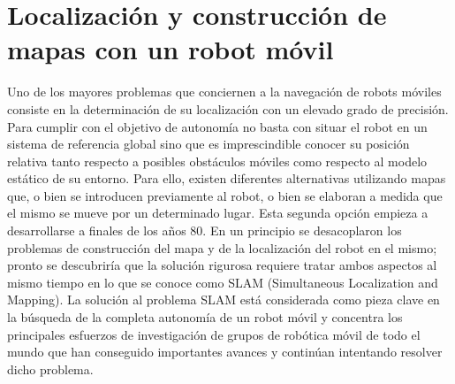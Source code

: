 \section{Localización y construcción de mapas con un robot móvil}
Uno de los mayores problemas que conciernen a la navegación de robots móviles consiste en la determinación de su localización con un elevado grado de precisión. Para cumplir con el objetivo de autonomía no basta con situar el robot en un sistema de referencia global sino que es imprescindible conocer su posición relativa tanto respecto a posibles obstáculos móviles como respecto al modelo estático de su entorno. Para ello, existen diferentes alternativas utilizando mapas que, o bien se introducen previamente al robot, o bien se elaboran a medida que el mismo se mueve por un determinado lugar. Esta segunda opción empieza a desarrollarse a finales de los años 80. En un principio se desacoplaron los problemas de construcción del mapa y de la localización del robot en el mismo; pronto se descubriría que la solución rigurosa requiere tratar ambos aspectos al mismo tiempo en lo que se conoce como SLAM (Simultaneous Localization and Mapping). La solución al problema SLAM está considerada como pieza clave en la búsqueda de la completa autonomía de un robot móvil y concentra los principales esfuerzos de investigación de grupos de robótica móvil de todo el mundo que han conseguido importantes avances y continúan intentando resolver dicho problema.

